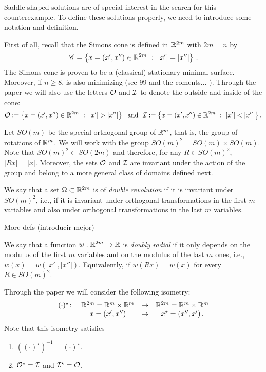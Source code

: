 Saddle-shaped solutions are of special interest in the search for this counterexample. To define these solutions properly, we need to introduce some notation and definition.

First of all, recall that the Simons cone is defined in $\mathbb{R}^{2m}$ with $2m = n$ by
\begin{equation}
\label{Eq:SimonsCone}
	\mathscr{C} = \left \{ x = (x', x'') \in \mathbb{R}^{2m} \ : \ |x'| = |x''| \right \}\,.
\end{equation}
The Simons cone is proven to be a (classical) stationary minimal surface. Moreover, if $n\geq 8$, is also minimizing (see 99 and the coments... ). 
Through the paper we will also use the letters $\mathcal{O}$ and $\mathcal{I}$ to denote the outside and inside of the cone:
\begin{equation}
\label{Eq:DefOandI}
\mathcal{O}:= \left \{ x = (x', x'') \in \mathbb{R}^{2m} \ : \ |x'| > |x''| \right \} \ \textrm{ and } \
\mathcal{I}:= \left \{ x = (x', x'') \in \mathbb{R}^{2m} \ : \ |x'| < |x''| \right \}.
\end{equation}


Let $SO(m)$ be the special orthogonal group of $\mathbb{R}^m$, that is, the group of rotations of $\mathbb{R}^m$. We will work with the group $SO(m)^2 = SO(m) \times SO(m)$. Note that $SO(m)^2 \subset SO(2m)$ and therefore, for any $R\in SO(m)^2$, $|Rx| = |x|$. Moreover, the sets $\mathcal{O}$ and $\mathcal{I}$ are invariant under the action of the group and belong to a more general class of domains defined next.

\begin{definition}
\label{Def:DoubleRevolutionSet}
We say that a set $\Omega\subset \mathbb{R}^{2m}$ is of \emph{double revolution} if it is invariant under $SO(m)^2$, i.e., if it is invariant under orthogonal transformations in the first $m$ variables and also under orthogonal transformations in the last $m$ variables.
\end{definition}

More defs (introducir mejor)

\begin{definition}
\label{Def:DoublyRadial}
We say that a function $w:\mathbb{R}^{2m} \to \mathbb{R}$ is \emph{doubly radial} if it only depends on the modulus of the first $m$ variables and on the modulus of the last $m$ ones, i.e., $w(x) = w(|x'|,|x''|)$. Equivalently, if $w(Rx) = w(x)$ for every $R \in SO(m)^2$.
\end{definition}

Through the paper we will consider the following isometry:
\begin{equation}
\label{Eq:DefStar}
\begin{matrix}
(\cdot)^\star \colon & \mathbb{R}^{2m}= \mathbb{R}^{m}\times \mathbb{R}^{m}  &\to&  \mathbb{R}^{2m}= \mathbb{R}^{m}\times \mathbb{R}^{m}  \\
	& x = (x',x'') &\mapsto & x^\star = (x'',x')\,.
\end{matrix}
\end{equation}
Note that this isometry satisfies
\begin{enumerate}
\item $((\cdot)^\star)^{-1} = (\cdot)^\star$.
\item $\mathcal{O}^\star= \mathcal{I}$ and $\mathcal{I}^\star = \mathcal{O}$.
\end{enumerate}


